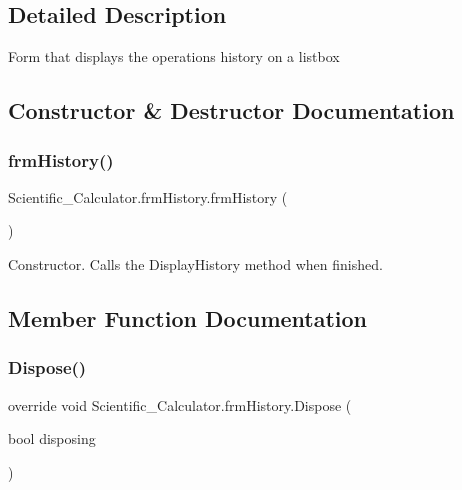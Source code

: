 \subsection{Detailed Description}
Form that displays the operations history on a listbox 



\subsection{Constructor \& Destructor Documentation}
\mbox{\label{class_scientific___calculator_1_1frm_history_aab640c35614c8ad1c64b1e3150bd8ed1}} 
\subsubsection{\texorpdfstring{frm\+History()}{frmHistory()}}
{\footnotesize\ttfamily Scientific\+\_\+\+Calculator.\+frm\+History.\+frm\+History (\begin{DoxyParamCaption}{ }\end{DoxyParamCaption})}



Constructor. Calls the Display\+History method when finished. 



\subsection{Member Function Documentation}
\mbox{\label{class_scientific___calculator_1_1frm_history_adf91a5ec5e4df47f129c8a1a57161155}} 
\subsubsection{\texorpdfstring{Dispose()}{Dispose()}}
{\footnotesize\ttfamily override void Scientific\+\_\+\+Calculator.\+frm\+History.\+Dispose (\begin{DoxyParamCaption}\item[{bool}]{disposing }\end{DoxyParamCaption})\hspace{0.3cm}{\ttfamily [protected]}}



